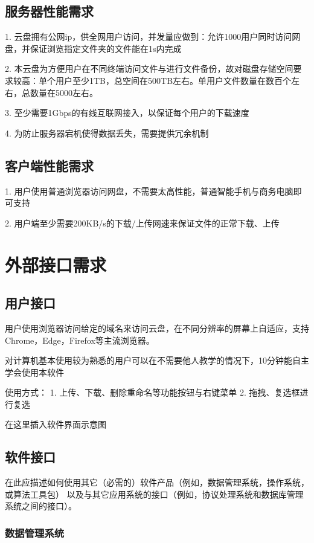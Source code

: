 \subsection{服务器性能需求}
 
1. 云盘拥有公网ip，供全网用户访问，并发量应做到：允许1000用户同时访问网盘，并保证浏览指定文件夹的文件能在1s内完成

2. 本云盘为方便用户在不同终端访问文件与进行文件备份，故对磁盘存储空间要求较高：单个用户至少1TB，总空间在500TB左右。单用户文件数量在数百个左右，总数量在5000左右。

3. 至少需要1Gbps的有线互联网接入，以保证每个用户的下载速度

4. 为防止服务器宕机使得数据丢失，需要提供冗余机制

\subsection{客户端性能需求}

1. 用户使用普通浏览器访问网盘，不需要太高性能，普通智能手机与商务电脑即可支持

2. 用户端至少需要200KB/s的下载/上传网速来保证文件的正常下载、上传

\section{外部接口需求}
\subsection{用户接口}

用户使用浏览器访问给定的域名来访问云盘，在不同分辨率的屏幕上自适应，支持Chrome，Edge，Firefox等主流浏览器。

对计算机基本使用较为熟悉的用户可以在不需要他人教学的情况下，10分钟能自主学会使用本软件

使用方式：
1. 上传、下载、删除重命名等功能按钮与右键菜单
2. 拖拽、复选框进行复选

在这里插入软件界面示意图

\subsection{软件接口}

在此应描述如何使用其它（必需的）软件产品（例如，数据管理系统，操作系统，或算法工具包）
以及与其它应用系统的接口（例如，协议处理系统和数据库管理系统之间的接口）。

\subsubsection{数据管理系统}

